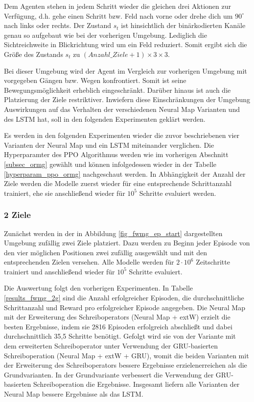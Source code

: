 Dem Agenten stehen in jedem Schritt wieder die gleichen drei Aktionen zur Verfügung, d.h. gehe einen Schritt bzw. Feld nach vorne oder drehe dich um $90^\circ$ nach links oder rechts. Der Zustand $s_t$ ist hinsichtlich der binärkodierten Kanäle genau so aufgebaut wie bei der vorherigen Umgebung. Lediglich die Sichtreichweite in Blickrichtung wird um ein Feld reduziert. Somit ergibt sich die Größe des Zustands $s_t$ zu $(Anzahl\_Ziele + 1) \times 3 \times 3$.

Bei dieser Umgebung wird der Agent im Vergleich zur vorherigen Umgebung mit vorgegeben Gängen bzw. Wegen konfrontiert. Somit ist seine Bewegungsmöglichkeit erheblich eingeschränkt. Darüber hinaus ist auch die Platzierung der Ziele restriktiver. Inwiefern diese Einschränkungen der Umgebung Auswirkungen auf das Verhalten der verschiedenen Neural Map Varianten und des LSTM hat, soll in den folgenden Experimenten geklärt werden.

Es werden in den folgenden Experimenten wieder die zuvor beschriebenen vier Varianten der Neural Map und ein LSTM miteinander verglichen. Die Hyperparamter des PPO Algorithmus werden wie im vorherigen Abschnitt \ref{subsec_ormg} gewählt und können infolgedessen wieder in der Tabelle \ref{hyperparam_ppo_ormg} nachgeschaut werden. In Abhängigkeit der Anzahl der Ziele werden die Modelle zuerst wieder für eine entsprechende Schrittanzahl trainiert, ehe sie anschließend wieder für $10^5$ Schritte evaluiert werden.

\subsubsection{2 Ziele}

Zunächst werden in der in Abbildung \ref{fig_fwmg_ep_start} dargestellten Umgebung zufällig zwei Ziele platziert. Dazu werden zu Beginn jeder Episode von den vier möglichen Positionen zwei zufällig ausgewählt und mit den entsprechenden Zielen versehen. Alle Modelle werden für $2\cdot10^6$ Zeitschritte trainiert und anschließend wieder für $10^5$ Schritte evaluiert.

Die Auswertung folgt den vorherigen Experimenten. In Tabelle \ref{results_fwmg_2g} sind die Anzahl erfolgreicher Episoden, die durchschnittliche Schrittanzahl und Reward pro erfolgreicher Episode angegeben. Die Neural Map mit der Erweiterung des Schreiboperators (Neural Map + extW) erzielt die besten Ergebnisse, indem sie 2816 Episoden erfolgreich abschließt und dabei durchschnittlich 35,5 Schritte benötigt. Gefolgt wird sie von der Variante mit dem erweiterten Schreiboperator unter Verwendung der GRU-basierten Schreiboperation (Neural Map + extW + GRU), womit die beiden Varianten mit der Erweiterung des Schreiboperators bessere Ergebnisse erzielenerreichen als die Grundvarianten. In der Grundvariante verbessert die Verwendung der GRU-basierten Schreiboperation die Ergebnisse. Insgesamt liefern alle Varianten der Neural Map bessere Ergebnisse als das LSTM.

